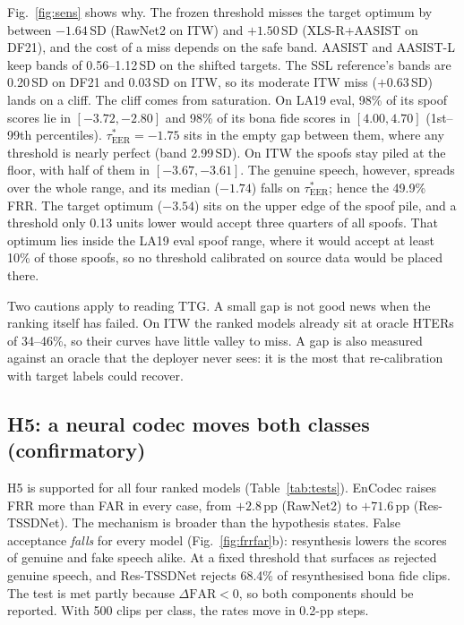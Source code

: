 \documentclass[conference]{IEEEtran}
\newcommand{\far}{\mathrm{FAR}}
\newcommand{\tauE}{\tau^{*}_{\mathrm{EER}}}
\begin{document}
Fig.~\ref{fig:sens} shows why. The frozen threshold misses the target optimum
by between \(-1.64\)\,SD (RawNet2 on ITW) and \(+1.50\)\,SD (XLS-R+AASIST on
DF21), and the cost of a miss depends on the safe band. AASIST and AASIST-L
keep bands of 0.56--1.12\,SD on the shifted targets. The SSL reference's bands
are 0.20\,SD on DF21 and 0.03\,SD on ITW, so its moderate ITW miss
(\(+0.63\)\,SD) lands on a cliff. The cliff comes from saturation. On LA19 eval,
98\% of its spoof scores lie in \([-3.72,-2.80]\) and 98\% of its bona fide
scores in \([4.00,4.70]\) (1st--99th percentiles). \(\tauE=-1.75\) sits in the
empty gap between them, where any threshold is nearly perfect (band
2.99\,SD). On ITW the spoofs stay piled at the floor, with half of them in
\([-3.67,-3.61]\). The genuine speech, however, spreads over the whole range,
and its median (\(-1.74\)) falls on \(\tauE\); hence the 49.9\% FRR. The
target optimum (\(-3.54\)) sits on the upper edge of the spoof pile, and a
threshold only 0.13 units lower would accept three quarters of all spoofs. That
optimum lies inside the LA19 eval spoof range, where it would accept at least
10\% of those spoofs, so no threshold calibrated on source data would be placed
there.

Two cautions apply to reading TTG. A small gap is not good news when the ranking
itself has failed. On ITW the ranked models already sit at oracle HTERs of
34--46\%, so their curves have little valley to miss. A gap is also measured
against an oracle that the deployer never sees: it is the most that
re-calibration with target labels could recover.

\subsection{H5: a neural codec moves both classes (confirmatory)}
H5 is supported for all four ranked models (Table~\ref{tab:tests}). EnCodec
raises FRR more than FAR in every case, from \(+2.8\)\,pp (RawNet2) to
\(+71.6\)\,pp (Res-TSSDNet). The mechanism is broader than the hypothesis
states. False acceptance \emph{falls} for every model (Fig.~\ref{fig:frrfar}b):
resynthesis lowers the scores of genuine and fake speech alike. At a fixed
threshold that surfaces as rejected genuine speech, and Res-TSSDNet rejects
68.4\% of resynthesised bona fide clips. The test is met partly because
\(\Delta\far<0\), so both components should be reported. With 500 clips per
class, the rates move in 0.2-pp steps.
\end{document}
